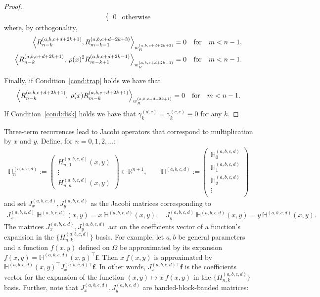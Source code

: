 \documentclass[11pt, oneside]{article}   	%
\newcommand{\R}{\mathbb{R}}
\newcommand{\hdop}{H}
\newcommand{\bighdop}{\mathbb{\hdop}}
\newcommand{\genjac}{R}
\newcommand{\genjacnmk}{\genjac_{n-k}}
\newcommand{\genjacw}{w_\genjac}
\newcommand{\hdopnkabcd}{\hdop_{n,k}^{(a,b,c,d)}}
\newcommand{\hdopabcd}{\hdop^{(a,b,c,d)}}
\newcommand{\bighdopabcd}{\bighdop^{(a,b,c,d)}}
\def\condref#1{Condition~\ref{cond:#1}}
\begin{document}
\begin{proof}
\begin{align*}
\begin{cases}
		0 & \text{otherwise}
      	\end{cases}
\end{align*}
where, by orthogonality,
\begin{align*}
	\ip<\genjacnmk^{(a, b, c+d+2k+1)}, \genjac_{m-k-1}^{(a, b, c+d+2k+3)}>_{\genjacw^{(a, b, c+d+2k+3)}} &= 0 \qfor m < n-1, \\
	\ip<\genjacnmk^{(a, b, c+d+2k+1)}, \: \rho(x)^2 \genjac_{m-k+1}^{(a, b, c+d+2k-1)}>_{\genjacw^{(a, b, c+d+2k-1)}} &= 0 \qfor m < n-1.
\end{align*}

Finally, if \condref{trap} holds we have that 
$$
\ip<\genjacnmk^{(a, b, c+d+2k+1)}, \: \rho(x) \genjac_{m-k}^{(a, b, c+d+2k+1)}>_{\genjacw^{(a, b, c+d+2k+1)}} = 0 \qfor m < n-1.
$$
If \condref{disk} holds we have that $\gamma^{(d,c)}_{k} = \gamma^{(c,c)}_{k} \equiv 0$ for any $k$.

\end{proof}

Three-term recurrences lead to Jacobi operators that correspond to multiplication by $x$ and $y$. Define, for $n=0,1,2,\dots$: 
\begin{align*}
\bighdopabcd_n := \begin{pmatrix}
		\hdopabcd_{n,0}(x,y) \\
		\vdots \\
		\hdopabcd_{n,n}(x,y)
	\end{pmatrix} \in \R^{n+1}, 
\quad \quad 
\bighdopabcd := \begin{pmatrix}
		\bighdopabcd_0 \\
		\bighdopabcd_1 \\
		\bighdopabcd_2 \\
		\vdots \\
	\end{pmatrix}
\end{align*}
and set $J_x^{(a,b,c,d)}, J_y^{(a,b,c,d)}$ as the Jacobi matrices corresponding to
\begin{align}
J_x^{(a,b,c,d)} \: \bighdopabcd(x,y) = x \: \bighdopabcd(x,y), \quad J_y^{(a,b,c,d)} \: \bighdopabcd(x,y) = y \: \bighdopabcd(x,y).
\label{eqn:jacobimatricesdefinition}
\end{align}
The matrices $J_x^{(a,b,c,d)}, J_y^{(a,b,c,d)}$ act on the coefficients vector of a function's expansion in the $\{\hdopnkabcd\}$ basis. For example, let $a, b$ be general parameters and a function $f(x,y)$ defined on $\Omega$ be approximated by its expansion $f(x,y) = \bighdopabcd(x,y)^\top \mathbf{f}$. Then $x \: f(x,y)$ is approximated by $\bighdopabcd(x,y)^\top {J_x^{(a,b,c,d)\top}} \mathbf{f}$. In other words, ${J_x^{(a,b,c,d)\top}} \mathbf{f}$ is the coefficients vector for the expansion of the function $(x,y) \mapsto x \: f(x,y)$ in the  $\{\hdopnkabcd\}$ basis. Further, note that $J_x^{(a,b,c,d)}, J_y^{(a,b,c,d)}$ are banded-block-banded matrices:
\end{document}
